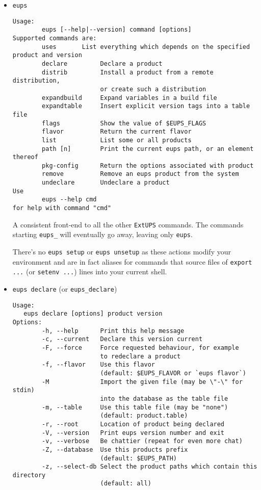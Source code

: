\documentclass{article}
\newcommand{\code}[1]{\texttt{#1}}
\newcommand{\eups}{\code{ExtUPS}}
\begin{document}
\begin{itemize}


  \item \code{eups}
\begin{verbatim}
Usage:
        eups [--help|--version] command [options]
Supported commands are:
        uses       List everything which depends on the specified product and version
        declare         Declare a product
        distrib         Install a product from a remote distribution,
                        or create such a distribution 
        expandbuild     Expand variables in a build file
        expandtable     Insert explicit version tags into a table file
        flags           Show the value of $EUPS_FLAGS
        flavor          Return the current flavor
        list            List some or all products
        path [n]        Print the current eups path, or an element thereof
        pkg-config      Return the options associated with product
        remove          Remove an eups product from the system
        undeclare       Undeclare a product
Use
        eups --help cmd
for help with command "cmd"
\end{verbatim}				%
  
A consistent front-end to all the other \eups{} commands.  The commands
starting \code{eups\_} will eventually go away, leaving only \code{eups}.

There's no \code{eups setup} or \code{eups unsetup} as these actions
modify your environment and are in fact aliases for commands
that source files of \code{export ...} (or \code{setenv ...}) lines
into your current shell.

\item \code{eups declare} (or \code{eups\_declare})
\begin{verbatim}
Usage:
   eups declare [options] product version
Options:
        -h, --help      Print this help message
        -c, --current   Declare this version current
        -F, --force     Force requested behaviour, for example
                        to redeclare a product
        -f, --flavor    Use this flavor
                        (default: $EUPS_FLAVOR or `eups flavor`)
        -M              Import the given file (may be \"-\" for stdin)
                        into the database as the table file
        -m, --table     Use this table file (may be "none")
                        (default: product.table)
        -r, --root      Location of product being declared
        -V, --version   Print eups version number and exit
        -v, --verbose   Be chattier (repeat for even more chat)
        -Z, --database  Use this products prefix
                        (default: $EUPS_PATH)
        -z, --select-db Select the product paths which contain this directory 
                        (default: all)
\end{verbatim}


\end{itemize}
\end{document}
